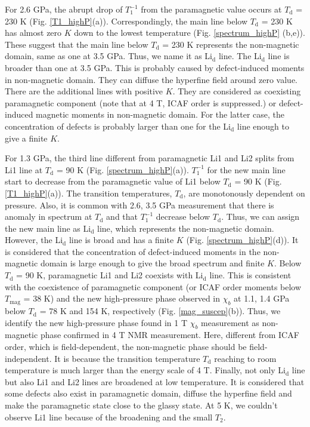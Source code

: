 For 2.6 GPa, the abrupt drop of $T^{-1}_1$ from the paramagnetic value occurs at $T_{\mathrm{d}}$ = 230 K (Fig. \ref{T1_highP}(a)).
Correspondingly, the main line below $T_{\mathrm{d}}$ = 230 K has almost zero $K$ down to the lowest temperature (Fig. \ref{spectrum_highP} (b,e)).
These suggest that the main line below $T_{\mathrm{d}}$ = 230 K represents the non-magnetic domain, same as one at 3.5 GPa.
Thus, we name it as Li$_\mathrm{d}$ line.
The Li$_\mathrm{d}$ line is broader than one at 3.5 GPa.
This is probably caused by defect-induced moments in non-magnetic domain.
They can diffuse the hyperfine field around zero value.
There are the additional lines with positive $K$.
They are considered as coexisting paramagnetic component (note that at 4 T, ICAF order is suppressed.) or defect-induced magnetic moments in non-magnetic domain.
For the latter case, the concentration of defects is probably larger than one for the Li$_\mathrm{d}$ line enough to give a finite $K$.

For 1.3 GPa, the third line different from paramagnetic Li1 and Li2 splits from Li1 line at $T_{\mathrm{d}}$ = 90 K (Fig. \ref{spectrum_highP}(a)).
$T^{-1}_1$ for the new main line start to decrease from the paramagnetic value of Li1 below $T_{\mathrm{d}}$ = 90 K (Fig. \ref{T1_highP}(a)).
The transition temperatures, $T_{\mathrm{d}}$, are monotonously dependent on pressure.
Also, it is common with 2.6, 3.5 GPa measurement that there is anomaly in spectrum at $T_{\mathrm{d}}$ and that $T^{-1}_1$ decrease below $T_{\mathrm{d}}$.
Thus, we can assign the new main line as Li$_\mathrm{d}$ line, which represents the non-magnetic domain.
However, the Li$_\mathrm{d}$ line is broad and has a finite $K$ (Fig. \ref{spectrum_highP}(d)).
It is considered that the concentration of defect-induced moments in the non-magnetic domain is large enough to give the broad spectrum and finite $K$.
Below $T_{\mathrm{d}}$ = 90 K, paramagnetic Li1 and Li2 coexists with Li$_\mathrm{d}$ line.
This is consistent with the coexistence of paramagnetic component (or ICAF order moments below $T_\mathrm{mag}$ = 38 K)
and the new high-pressure phase observed in $\chi_b$ at 1.1, 1.4 GPa below $T_{\mathrm{d}}$ = 78 K and 154 K, respectively (Fig. \ref{mag_suscep}(b)).
Thus, we identify the new high-pressure phase found in 1 T $\chi_b$ measurement as non-magnetic phase confirmed in 4 T NMR measurement.
Here, different from ICAF order, which is field-dependent, the non-magnetic phase should be field-independent.
It is because the transition temperature $T_{\mathrm{d}}$ reaching to room temperature is much larger than the energy scale of 4 T.
Finally, not only Li$_\mathrm{d}$ line but also Li1 and Li2 lines are broadened at low temperature.
It is considered that some defects also exist in paramagnetic domain, diffuse the hyperfine field and make the paramagnetic state close to the glassy state.
At 5 K, we couldn't observe Li1 line because of the broadening and the small $T_2$.

